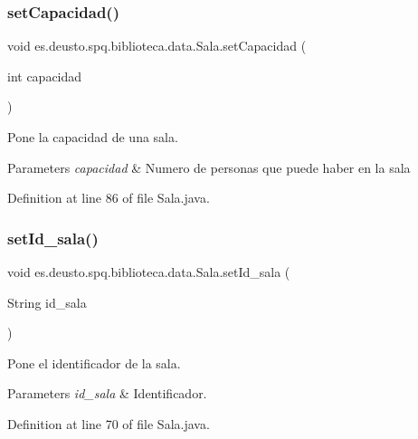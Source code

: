 \subsubsection{\texorpdfstring{set\+Capacidad()}{setCapacidad()}}
{\footnotesize\ttfamily void es.\+deusto.\+spq.\+biblioteca.\+data.\+Sala.\+set\+Capacidad (\begin{DoxyParamCaption}\item[{int}]{capacidad }\end{DoxyParamCaption})}

Pone la capacidad de una sala. 
\begin{DoxyParams}{Parameters}
{\em capacidad} & Numero de personas que puede haber en la sala \\
\hline
\end{DoxyParams}


Definition at line 86 of file Sala.\+java.

\mbox{\label{classes_1_1deusto_1_1spq_1_1biblioteca_1_1data_1_1_sala_ad0f59651a28b3ea02c1ae45cc8a2c24c}} 
\subsubsection{\texorpdfstring{set\+Id\+\_\+sala()}{setId\_sala()}}
{\footnotesize\ttfamily void es.\+deusto.\+spq.\+biblioteca.\+data.\+Sala.\+set\+Id\+\_\+sala (\begin{DoxyParamCaption}\item[{String}]{id\+\_\+sala }\end{DoxyParamCaption})}

Pone el identificador de la sala. 
\begin{DoxyParams}{Parameters}
{\em id\+\_\+sala} & Identificador. \\
\hline
\end{DoxyParams}


Definition at line 70 of file Sala.\+java.

\mbox{\label{classes_1_1deusto_1_1spq_1_1biblioteca_1_1data_1_1_sala_a250c1f00b03d5ae3fb48c87189580c00}} 
